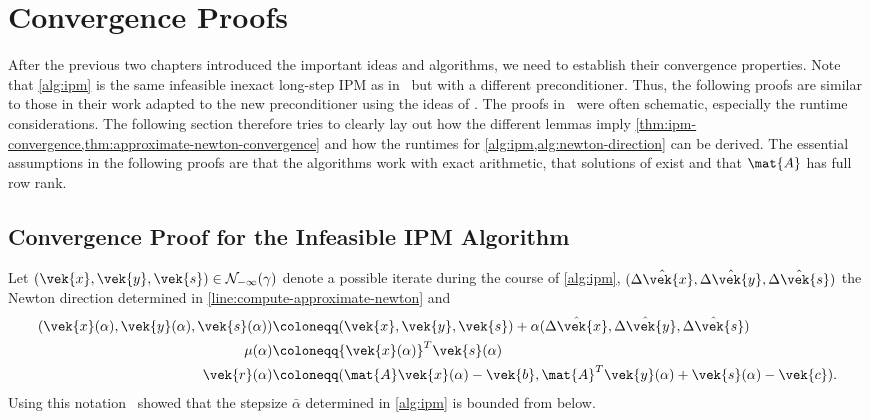 \chapter{Convergence Proofs}\label{chap:convergence}

After the previous two chapters introduced the important ideas and algorithms, we need to establish their convergence properties.
Note that \cref{alg:ipm} is the same infeasible inexact long-step IPM as in~\cite{Monteiro-ConvergenceAnalysisLongStepInfeasibleIPMs} but with a different preconditioner.
Thus, the following proofs are similar to those in their work adapted to the new preconditioner using the ideas of \textcite{Avron-FasterRandomizedInfeasibleIPMs}.
The proofs in~\cite{Avron-FasterRandomizedInfeasibleIPMs} were often schematic, especially the runtime considerations.
The following section therefore tries to clearly lay out how the different lemmas imply \cref{thm:ipm-convergence,thm:approximate-newton-convergence} and how the runtimes for \cref{alg:ipm,alg:newton-direction} can be derived.
The essential assumptions in the following proofs are that the algorithms work with exact arithmetic, that solutions of  exist and that \(\mat{A}\) has full row rank.

\section{Convergence Proof for the Infeasible IPM Algorithm}

Let \((\vek{x}, \vek{y}, \vek{s}) \in \mathcal{N}_{-\infty}(\gamma)\) denote a possible iterate during the course of \cref{alg:ipm}, \((\hat{\Delta\vek{x}}, \hat{\Delta\vek{y}}, \hat{\Delta\vek{s}})\) the Newton direction determined in \cref{line:compute-approximate-newton} and 
\begin{align}
  (\vek{x}(\alpha), \vek{y}(\alpha), \vek{s}(\alpha)) &\coloneqq (\vek{x}, \vek{y}, \vek{s}) + \alpha (\hat{\Delta\vek{x}}, \hat{\Delta\vek{y}}, \hat{\Delta\vek{s}}) \\
  \mu(\alpha) &\coloneqq {\vek{x}(\alpha)}^T \vek{s}(\alpha) \\
  \vek{r}(\alpha) &\coloneqq (\mat{A}\vek{x}(\alpha) - \vek{b}, \mat{A}^T \vek{y}(\alpha) + \vek{s}(\alpha) - \vek{c}).
\end{align}
Using this notation~\textcite{Monteiro-ConvergenceAnalysisLongStepInfeasibleIPMs} showed that the stepsize \(\bar{\alpha}\) determined in \cref{alg:ipm} is bounded from below.

